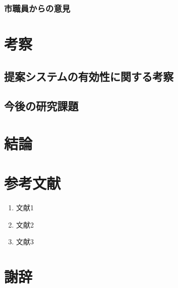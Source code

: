\documentclass[uplatex,a4j,10pt,titlepage]{jsarticle}
\begin{document}
\subsubsection{市職員からの意見}

\section{考察}
\subsection{提案システムの有効性に関する考察}
\subsection{今後の研究課題}

\section{結論}

\section*{参考文献}
\begin{enumerate}
	\item 文献1
	\item 文献2
	\item 文献3
\end{enumerate}

\section*{謝辞}
\end{document}
